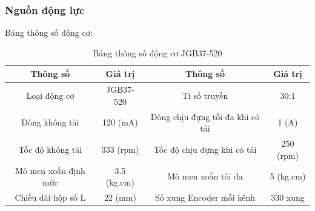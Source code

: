             \subsubsection{Nguồn động lực}
                \hspace*{0.6cm}Bảng thông số động cơ:
                \begin{table}[H]
                    \centering
                    \begin{tabular}{|c|c|c|c|}
                        \hline
                        \textbf{Thông số} & \textbf{Giá trị} & \textbf{Thông số} & \textbf{Giá trị} \\
                        \hline
                        Loại động cơ & JGB37-520 & Tỉ số truyền & 30:1 \\
                        \hline
                        Dòng không tải & 120 (mA) & Dòng chịu đựng tối đa khi có tải & 1 (A) \\
                        \hline
                        Tốc độ không tải & 333 (rpm) & Tốc độ chịu đựng khi có tải & 250 (rpm) \\
                        \hline
                        Mô men xoắn định mức & 3.5 (kg.cm) & Mô men xoắn tối đa & 5 (kg.cm) \\
                        \hline
                        Chiều dài hộp số L & 22 (mm) & Số xung Encoder mỗi kênh & 330 xung \\
                        \hline
                    \end{tabular}
                    \caption{Bảng thông số động cơ JGB37-520}
                    \label{tab:4-5}
                \end{table}
